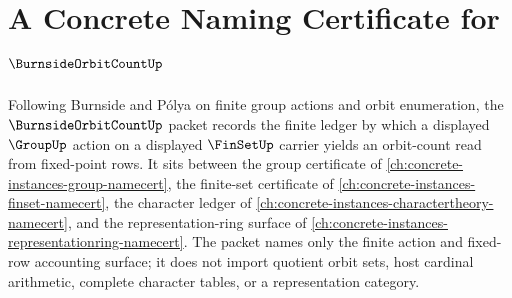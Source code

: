 \chapter{A Concrete Naming Certificate for $\BurnsideOrbitCountUp$}
\label{ch:concrete-instances-burnside-orbit-count-namecert}

Following Burnside and Pólya on finite group actions and orbit enumeration, the $\BurnsideOrbitCountUp$ packet records the finite ledger by which a displayed $\GroupUp$ action on a displayed $\FinSetUp$ carrier yields an orbit-count read from fixed-point rows. It sits between the group certificate of \autoref{ch:concrete-instances-group-namecert}, the finite-set certificate of \autoref{ch:concrete-instances-finset-namecert}, the character ledger of \autoref{ch:concrete-instances-charactertheory-namecert}, and the representation-ring surface of \autoref{ch:concrete-instances-representationring-namecert}. The packet names only the finite action and fixed-row accounting surface; it does not import quotient orbit sets, host cardinal arithmetic, complete character tables, or a representation category.

